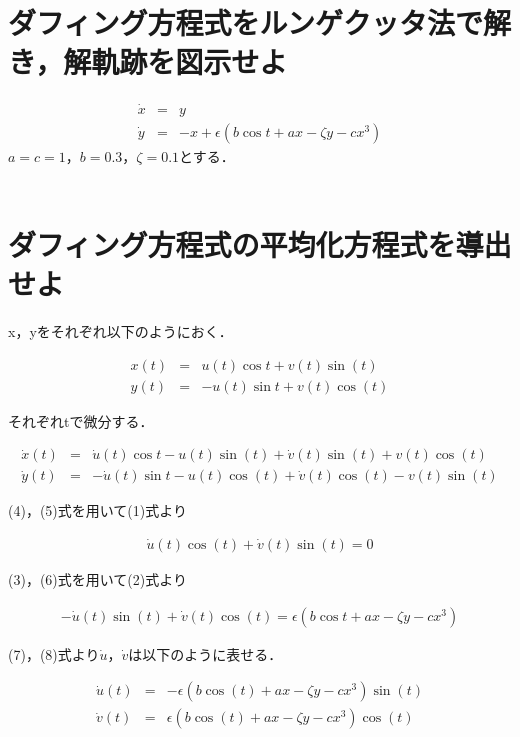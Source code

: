 
	\section{ダフィング方程式をルンゲクッタ法で解き，解軌跡を図示せよ} \label{seq:sample}
		\begin{eqnarray}
			\dot{x} & = & y \\
			\dot{y} & = & -x + \epsilon (b \cos{t}+ax-\zeta y - cx^3)
		\end{eqnarray}
		$a=c=1$，$b=0.3$，$\zeta = 0.1$とする．\\
		\\
	\section{ダフィング方程式の平均化方程式を導出せよ} \label{seq:sample}

		x，yをそれぞれ以下のようにおく．

		\begin{eqnarray}
			x(t) & = & u(t) \cos{t} + v(t) \sin(t) \\
			y(t) & = & - u(t) \sin{t} + v(t) \cos(t)
		\end{eqnarray}

		それぞれtで微分する．

		\begin{eqnarray}
			\dot{x}(t) & = & \dot{u}(t) \cos{t} -u(t) \sin(t) + \dot{v}(t) \sin(t) +v(t) \cos(t) \\
			\dot{y}(t) & = & - \dot{u}(t) \sin{t} -u(t) \cos(t) + \dot{v}(t) \cos(t) - v(t) \sin(t)
		\end{eqnarray}

		(4)，(5)式を用いて(1)式より

		\begin{eqnarray}
			\dot{u}(t) \cos(t) + \dot{v}(t) \sin(t) = 0
		\end{eqnarray}

		(3)，(6)式を用いて(2)式より

		\begin{eqnarray}
			 - \dot{u}(t) \sin(t) + \dot{v}(t) \cos (t) = \epsilon (b \cos{t}+ax-\zeta y - cx^3)
		\end{eqnarray}

		(7)，(8)式より$\dot{u}$，$\dot{v}$は以下のように表せる．

		\begin{eqnarray}
			\dot{u}(t) & = & - \epsilon (b \cos(t)+ax-\zeta y - cx^3) \sin (t) \\
			\dot{v}(t) & = & \epsilon (b \cos(t)+ax-\zeta y - cx^3) \cos (t)
		\end{eqnarray}

